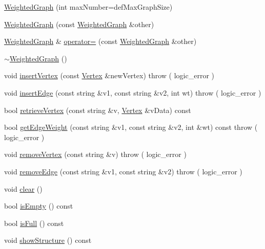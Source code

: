 \begin{DoxyCompactItemize}
\item 
\hyperlink{class_weighted_graph_acf8f5b4f212bc8daf4b12f0b88899180}{Weighted\+Graph} (int max\+Number=def\+Max\+Graph\+Size)
\item 
\hyperlink{class_weighted_graph_a294fd717db213e761dc0eb65bbfcb7ab}{Weighted\+Graph} (const \hyperlink{class_weighted_graph}{Weighted\+Graph} \&other)
\item 
\hyperlink{class_weighted_graph}{Weighted\+Graph} \& \hyperlink{class_weighted_graph_aa5982a507e944af28e4749cdc06543c6}{operator=} (const \hyperlink{class_weighted_graph}{Weighted\+Graph} \&other)
\item 
\hyperlink{class_weighted_graph_ad7b4a5c8206772f9f4fb5906c0d64923}{$\sim$\+Weighted\+Graph} ()
\item 
void \hyperlink{class_weighted_graph_aec4ef3455e3cc0d73a42e042adb7ac40}{insert\+Vertex} (const \hyperlink{class_weighted_graph_1_1_vertex}{Vertex} \&new\+Vertex)  throw ( logic\+\_\+error )
\item 
void \hyperlink{class_weighted_graph_a6f59ad223d921324c3ec629d0d6e4eea}{insert\+Edge} (const string \&v1, const string \&v2, int wt)  throw ( logic\+\_\+error )
\item 
bool \hyperlink{class_weighted_graph_a3afabc2236c99dac950f5161f715f114}{retrieve\+Vertex} (const string \&v, \hyperlink{class_weighted_graph_1_1_vertex}{Vertex} \&v\+Data) const 
\item 
bool \hyperlink{class_weighted_graph_ab136044e7378313087be69eb43e7f042}{get\+Edge\+Weight} (const string \&v1, const string \&v2, int \&wt) const   throw ( logic\+\_\+error )
\item 
void \hyperlink{class_weighted_graph_abaaa572a9b1a60ec3cd99d8db9d9590e}{remove\+Vertex} (const string \&v)  throw ( logic\+\_\+error )
\item 
void \hyperlink{class_weighted_graph_a1db455249fa7fedf70aa5683487a17df}{remove\+Edge} (const string \&v1, const string \&v2)  throw ( logic\+\_\+error )
\item 
void \hyperlink{class_weighted_graph_a26890ebf74d23821a6e4dbcf803b5002}{clear} ()
\item 
bool \hyperlink{class_weighted_graph_a1c03a0f68447cf88fed97c2076501702}{is\+Empty} () const 
\item 
bool \hyperlink{class_weighted_graph_a22e56836e3967031a657cfa9ea5b9843}{is\+Full} () const 
\item 
void \hyperlink{class_weighted_graph_ad7f20a989073ea5401d504d944182347}{show\+Structure} () const 

\end{DoxyCompactItemize}
